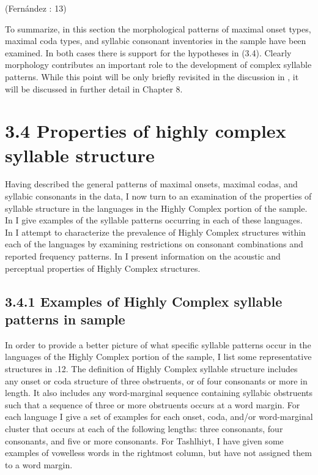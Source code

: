 (Fernández \citealt{GarayHernández2006}: 13)
\z

  To summarize, in this section the morphological patterns of maximal onset types, maximal coda types, and syllabic consonant inventories in the sample have been examined. In both cases there is support for the hypotheses in (3.4). Clearly morphology contributes an important role to the development of complex syllable patterns. While this point will be only briefly revisited in the discussion in , it will be discussed in further detail in Chapter 8.

\section{3.4 Properties of highly complex syllable structure}

  Having described the general patterns of maximal onsets, maximal codas, and syllabic consonants in the data, I now turn to an examination of the properties of syllable structure in the languages in the Highly Complex portion of the sample. In  I give examples of the syllable patterns occurring in each of these languages. In  I attempt to characterize the prevalence of Highly Complex structures within each of the languages by examining restrictions on consonant combinations and reported frequency patterns. In  I present information on the acoustic and perceptual properties of Highly Complex structures.

\subsection{3.4.1 Examples of Highly Complex syllable patterns in sample}

  In order to provide a better picture of what specific syllable patterns occur in the languages of the Highly Complex portion of the sample, I list some representative structures in .12. The definition of Highly Complex syllable structure includes any onset or coda structure of three obstruents, or of four consonants or more in length. It also includes any word-marginal sequence containing syllabic obstruents such that a sequence of three or more obstruents occurs at a word margin. For each language I give a set of examples for each onset, coda, and/or word-marginal cluster that occurs at each of the following lengths: three consonants, four consonants, and five or more consonants. For Tashlhiyt, I have given some examples of vowelless words in the rightmost column, but have not assigned them to a word margin.

